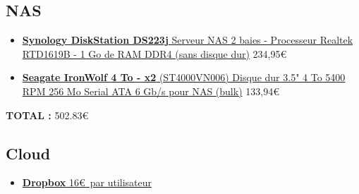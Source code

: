 \subsection{NAS}

\begin{itemize}
	\item \href{https://www.ldlc.com/fiche/PB00559191.html}{\textbf{Synology DiskStation DS223j} Serveur NAS 2 baies - Processeur Realtek RTD1619B - 1 Go de RAM DDR4 (sans disque dur)} 234,95\euro
	\item \href{https://www.ldlc.com/fiche/PB00494230.html)}{\textbf{Seagate IronWolf 4 To - x2} (ST4000VN006) Disque dur 3.5" 4 To 5400 RPM 256 Mo Serial ATA 6 Gb/s pour NAS (bulk)} 133,94\euro
\end{itemize}
\vspace{5px}
\textbf{TOTAL :} 502.83\euro

\subsection{Cloud}

\begin{itemize}
	\item \href{https://www.dropbox.com/plans}{\textbf{Dropbox} 16\euro\ par utilisateur}
\end{itemize}

